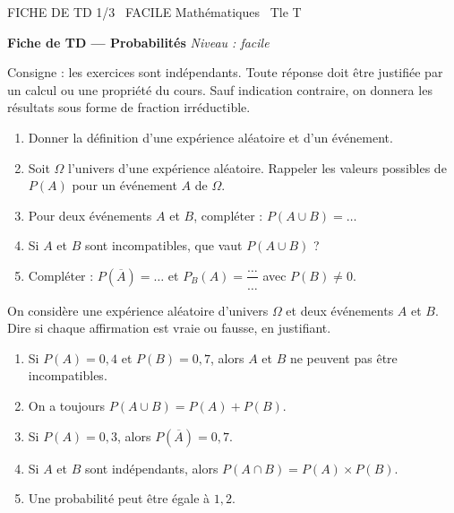 \documentclass[11pt]{article}
\begin{document}
\begin{tcolorbox}[enhanced,colback=popink,colframe=popink,arc=10pt,boxrule=0pt,left=12pt,right=12pt,top=9pt,bottom=9pt]
{\color{white}\popxbold\small FICHE DE TD 1/3 \textbullet\ FACILE \hfill Mathématiques \textbullet\ Tle T\par}
\end{tcolorbox}
\vspace{4pt}
\textbf{Fiche de TD — Probabilités} \hfill \textit{Niveau : facile}

Consigne : les exercices sont indépendants. Toute réponse doit être justifiée par un calcul ou une propriété du cours. Sauf indication contraire, on donnera les résultats sous forme de fraction irréductible.

\begin{exercice}
\begin{enumerate}
\item Donner la définition d'une expérience aléatoire et d'un événement.
\item Soit $\Omega$ l'univers d'une expérience aléatoire. Rappeler les valeurs possibles de $P(A)$ pour un événement $A$ de $\Omega$.
\item Pour deux événements $A$ et $B$, compléter : $P(A\cup B)=\ldots$
\item Si $A$ et $B$ sont incompatibles, que vaut $P(A\cup B)$ ?
\item Compléter : $P(\overline{A})=\ldots$ \quad et \quad $P_{B}(A)=\dfrac{\ldots}{\ldots}$ avec $P(B)\neq 0$.
\end{enumerate}
\end{exercice}

\begin{exercice}
On considère une expérience aléatoire d'univers $\Omega$ et deux événements $A$ et $B$. Dire si chaque affirmation est vraie ou fausse, en justifiant.
\begin{enumerate}
\item Si $P(A)=0{,}4$ et $P(B)=0{,}7$, alors $A$ et $B$ ne peuvent pas être incompatibles.
\item On a toujours $P(A\cup B)=P(A)+P(B)$.
\item Si $P(A)=0{,}3$, alors $P(\overline{A})=0{,}7$.
\item Si $A$ et $B$ sont indépendants, alors $P(A\cap B)=P(A)\times P(B)$.
\item Une probabilité peut être égale à $1{,}2$.
\end{enumerate}
\end{exercice}
\end{document}
